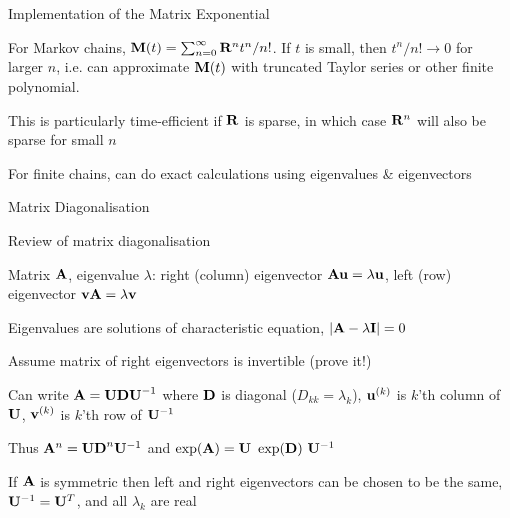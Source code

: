 \documentclass{beamer}
\begin{document}
\begin{frame}{Implementation of the Matrix Exponential}

\itemb
 \item For Markov chains, ${\bf M}(t) = \sum_{n=0}^\infty {\bf R}^n t^n / n!$. If $t$ is small, then $t^n/n! \to 0$ for larger $n$,
i.e. can approximate ${\bf M}(t)$ with truncated Taylor series or other finite polynomial.
\pause
 \item This is particularly time-efficient if ${\bf R}$ is sparse, in which case ${\bf R}^n$ will also be sparse for small $n$
\pause
 \item For finite chains, can do exact calculations using eigenvalues \& eigenvectors
\iteme

\end{frame}

\begin{frame}{Matrix Diagonalisation}

\itemb
\item Review of matrix diagonalisation
 \itemb
 \item Matrix ${\bf A}$, eigenvalue $\lambda$: right (column) eigenvector ${\bf Au} = \lambda{\bf u}$, left (row) eigenvector ${\bf v}{\bf A} = \lambda{\bf v}$
%
 \item Eigenvalues are solutions of \alert{characteristic equation}, $|{\bf A} - \lambda {\bf I}| = 0$
%
 \item Assume matrix of right eigenvectors is invertible (\alert{prove it!})
\pause
 \item Can write ${\bf A} = {\bf UDU}^{-1}$ where ${\bf D}$ is diagonal ($D_{kk} = \lambda_k$), ${\bf u}^{(k)}$ is $k$'th column of ${\bf U}$, ${\bf v}^{(k)}$ is $k$'th row of ${\bf U}^{-1}$
\pause
 \item Thus ${\bf A}^n = {\bf UD}^n{\bf U}^{-1}$ and $\exp({\bf A}) = {\bf U}\ \exp({\bf D})\ {\bf U}^{-1}$
\pause
 \item If ${\bf A}$ is symmetric then left and right eigenvectors can be chosen to be the same, ${\bf U}^{-1} = {\bf U}^T$, and all $\lambda_k$ are real
 \iteme
\iteme

\end{frame}
\end{document}
